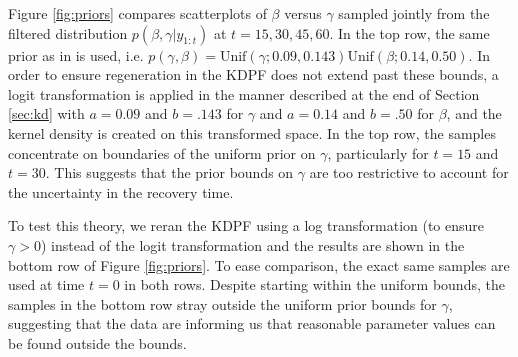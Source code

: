 \documentclass{elsarticle}
\begin{document}
Figure \ref{fig:priors} compares scatterplots of $\beta$ versus $\gamma$ sampled jointly from the filtered distribution $p(\beta,\gamma|y_{1:t})$ at $t = 15, 30, 45, 60$. In the top row, the same prior as in \citet{skvortsov2012monitoring} is used, i.e. \hbox{$p(\gamma,\beta) = \mbox{Unif}(\gamma;0.09, 0.143) \mbox{Unif}(\beta; 0.14, 0.50)$}. In order to ensure regeneration in the KDPF does not extend past these bounds, a logit transformation is applied in the manner described at the end of Section \ref{sec:kd} with $a = 0.09$ and $b = .143$ for $\gamma$ and $a = 0.14$ and $b = .50$ for $\beta$, and the kernel density is created on this transformed space. In the top row, the samples concentrate on boundaries of the uniform prior on $\gamma$, particularly for $t = 15$ and $t = 30$. This suggests that the prior bounds on $\gamma$ are too restrictive to account for the uncertainty in the recovery time.

To test this theory, we reran the KDPF using a log transformation (to ensure $\gamma>0$) instead of the logit transformation and the results are shown in the bottom row of Figure \ref{fig:priors}. To ease comparison, the exact same samples are used at time $t=0$ in both rows. Despite starting within the uniform bounds, the samples in the bottom row stray outside the uniform prior bounds for $\gamma$, suggesting that the data are informing us that reasonable parameter values can be found outside the bounds. %

\end{document}
